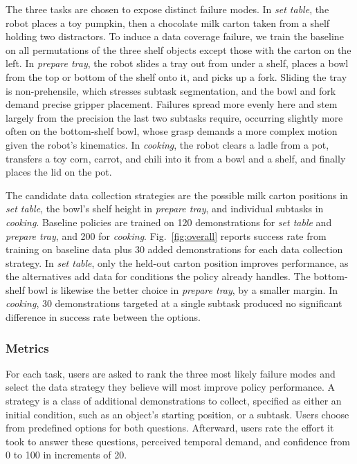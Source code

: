 \documentclass[letterpaper, 10 pt, conference]{ieeeconf}
\begin{document}
The three tasks are chosen to expose distinct failure modes. In \emph{set table}, the robot places a toy pumpkin, then a chocolate milk carton taken from a shelf holding two distractors. To induce a data coverage failure, we train the baseline on all permutations of the three shelf objects except those with the carton on the left. In \emph{prepare tray}, the robot slides a tray out from under a shelf, places a bowl from the top or bottom of the shelf onto it, and picks up a fork. Sliding the tray is non-prehensile, which stresses subtask segmentation, and the bowl and fork demand precise gripper placement. Failures spread more evenly here and stem largely from the precision the last two subtasks require, occurring slightly more often on the bottom-shelf bowl, whose grasp demands a more complex motion given the robot's kinematics. In \emph{cooking}, the robot clears a ladle from a pot, transfers a toy corn, carrot, and chili into it from a bowl and a shelf, and finally places the lid on the pot.

The candidate data collection strategies are the possible milk carton positions in \emph{set table}, the bowl's shelf height in \emph{prepare tray}, and individual subtasks in \emph{cooking}. Baseline policies are trained on 120 demonstrations for \emph{set table} and \emph{prepare tray}, and 200 for \emph{cooking}. 
Fig.~\ref{fig:overall} reports success rate from training on baseline data plus 30 added demonstrations for each data collection strategy.
In \emph{set table}, only the held-out carton position improves performance, as the alternatives add data for conditions the policy already handles. The bottom-shelf bowl is likewise the better choice in \emph{prepare tray}, by a smaller margin. In \emph{cooking}, 30 demonstrations targeted at a single subtask produced no significant difference in success rate between the options. 


\subsubsection{Metrics}

For each task, users are asked to rank the three most likely failure modes and select the data strategy they believe will most improve policy performance. A strategy is a class of additional demonstrations to collect, specified as either an initial condition, such as an object's starting position, or a subtask. Users choose from predefined options for both questions. Afterward, users rate the effort it took to answer these questions, perceived temporal demand, and confidence from 0 to 100 in increments of 20.
\end{document}
